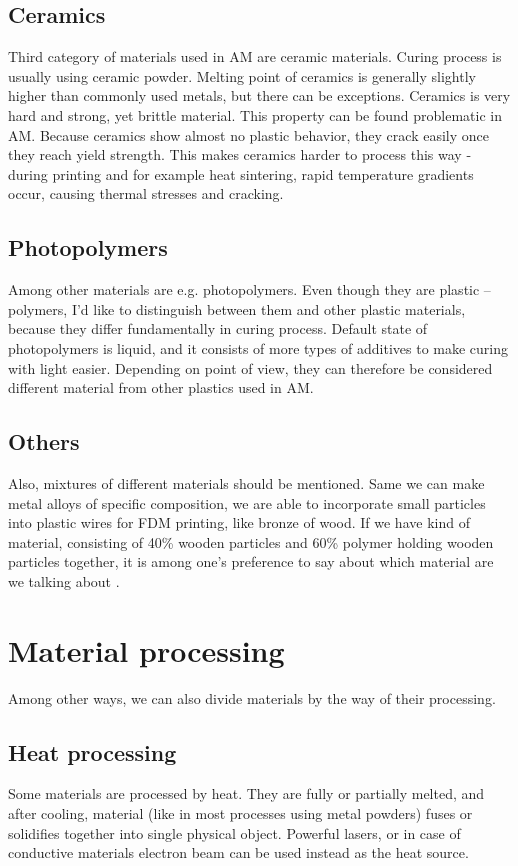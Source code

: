 \documentclass[a4paper, twoside, 11pt]{report}
\begin{document}
\subsection{Ceramics}
Third category of materials used in AM are ceramic materials. Curing process is usually using ceramic powder. Melting point of ceramics is generally slightly higher than commonly used metals, but there can be exceptions. Ceramics is very hard and strong, yet brittle material. This property can be found problematic in AM. Because ceramics show almost no plastic behavior, they crack easily once they reach yield strength. This makes ceramics harder to process this way - during printing and for example heat sintering, rapid temperature gradients occur, causing thermal stresses and cracking.
\subsection{Photopolymers}
Among other materials are e.g. photopolymers. Even though they are plastic – polymers, I'd like to distinguish between them and other plastic materials, because they differ fundamentally in curing process. Default state of photopolymers is liquid, and it consists of more types of additives to make curing with light easier. Depending on point of view, they can therefore be considered different material from other plastics used in AM.
\subsection{Others}
Also, mixtures of different materials should be mentioned. Same we can make metal alloys of specific composition, we are able to incorporate small particles into plastic wires for FDM printing, like bronze of wood. If we have kind of material, consisting of 40\% wooden particles and 60\% polymer holding wooden  particles together, it is among one’s preference to say about which material are we talking about \cite{WoodenFilament}.
\section{Material processing}
Among other ways, we can also divide materials by the way of their processing.
\subsection{Heat processing} Some materials are processed by heat. They are fully or partially melted, and after cooling, material (like in most processes using metal powders) fuses or solidifies together into single physical object. Powerful lasers, or in case of conductive materials electron beam can be used instead as the heat source.
\end{document}
